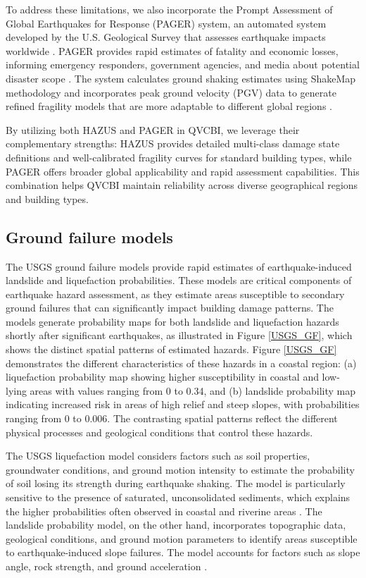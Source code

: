 \documentclass[review]{elsarticle}
\begin{document}
To address these limitations, we also incorporate the Prompt Assessment of Global Earthquakes for Response (PAGER) system, an automated system developed by the U.S. Geological Survey that assesses earthquake impacts worldwide \cite{pager1}. PAGER provides rapid estimates of fatality and economic losses, informing emergency responders, government agencies, and media about potential disaster scope \cite{pager2}. The system calculates ground shaking estimates using ShakeMap methodology \cite{pager3} and incorporates peak ground velocity (PGV) data to generate refined fragility models that are more adaptable to different global regions \cite{pager4}.

By utilizing both HAZUS and PAGER in QVCBI, we leverage their complementary strengths: HAZUS provides detailed multi-class damage state definitions and well-calibrated fragility curves for standard building types, while PAGER offers broader global applicability and rapid assessment capabilities. This combination helps QVCBI maintain reliability across diverse geographical regions and building types.

\subsection{Ground failure models}

The USGS ground failure models provide rapid estimates of earthquake-induced landslide \cite{nowicki2018global} and liquefaction \cite{zhu2017updated} probabilities. These models are critical components of earthquake hazard assessment, as they estimate areas susceptible to secondary ground failures that can significantly impact building damage patterns. The models generate probability maps for both landslide and liquefaction hazards shortly after significant earthquakes, as illustrated in Figure \ref{USGS_GF}, which shows the distinct spatial patterns of estimated hazards.
Figure \ref{USGS_GF} demonstrates the different characteristics of these hazards in a coastal region: (a) liquefaction probability map showing higher susceptibility in coastal and low-lying areas with values ranging from 0 to 0.34, and (b) landslide probability map indicating increased risk in areas of high relief and steep slopes, with probabilities ranging from 0 to 0.006. The contrasting spatial patterns reflect the different physical processes and geological conditions that control these hazards.

The USGS liquefaction model considers factors such as soil properties, groundwater conditions, and ground motion intensity to estimate the probability of soil losing its strength during earthquake shaking. The model is particularly sensitive to the presence of saturated, unconsolidated sediments, which explains the higher probabilities often observed in coastal and riverine areas \cite{zhu2017updated}. The landslide probability model, on the other hand, incorporates topographic data, geological conditions, and ground motion parameters to identify areas susceptible to earthquake-induced slope failures. The model accounts for factors such as slope angle, rock strength, and ground acceleration \cite{nowicki2018global}. 
\end{document}
